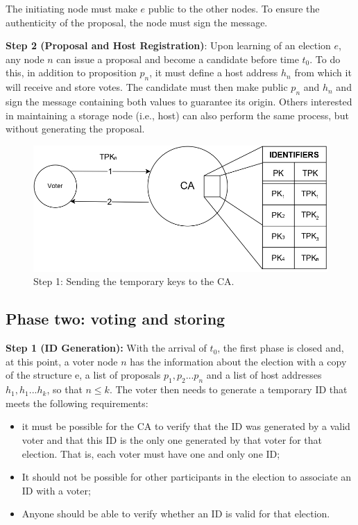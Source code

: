 \documentclass[english]{textolivre}
\begin{document}
The initiating node must make $e$ public to the other nodes. To ensure the authenticity of the proposal, the node must sign the message.

\textbf{Step 2 (Proposal and Host Registration)}: Upon learning of an election $e$, any node $n$ can issue a proposal and become a candidate before time $t_{0}$. To do this, in addition to proposition $p_{n}$, it must define a host address $h_{n}$ from which it will receive and store votes. The candidate must then make public $p_{n}$ and $h_{n}$ and sign the message containing both values to guarantee its origin. Others interested in maintaining a storage node (i.e., host) can also perform the same process, but without generating the proposal.



\begin{figure}[htb]
\centering
\begin{minipage}{.8\textwidth}
\includegraphics[width=\textwidth]{imagens/fig-002.png}
\caption{Step 1: Sending the temporary keys to the CA.}\label{fase2etapa1}
\end{minipage}
\end{figure}


\subsection{Phase two: voting and storing \label{sec-phase-two}}

\textbf{Step 1 (ID Generation):} With the arrival of $t_{0}$, the first phase is closed and, at this point, a voter node $n$ has the information about the election with a copy of the structure e, a list of proposals $p_{1}, p_{2} ... p_{n}$ and a list of host addresses $h_{1}, h_{1} ... h_{k}$, so that $n \le k$. The voter then needs to generate a temporary ID that meets the following requirements:

\begin{itemize}
\item it must be possible for the CA to verify that the ID was generated by a valid voter and that this ID is the only one generated by that voter for that election. That is, each voter must have one and only one ID;
    
\item It should not be possible for other participants in the election to associate an ID with a voter;

\item Anyone should be able to verify whether an ID is valid for that election.

\end{itemize}
\end{document}
